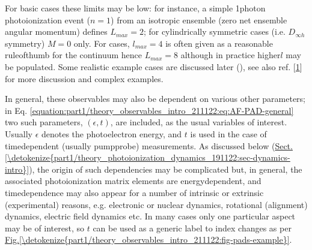 \documentclass[letterpaper,table,10pt,english]{jupyterBook}
\begin{document}
\sphinxAtStartPar
For basic cases these limits may be low: for instance, a simple 1\sphinxhyphen{}photon photoionization event (\(n=1\)) from an isotropic ensemble (zero net ensemble angular momentum) defines \(L_{max}=2\); for cylindrically symmetric cases (i.e. \(D_{\infty h}\) symmetry) \(M=0\) only. For {\hyperref[\detokenize{backmatter/glossary:term-MF}]{}} cases, \(l_{max}=4\) is often given as a reasonable rule\sphinxhyphen{}of\sphinxhyphen{}thumb for the continuum \sphinxhyphen{} hence \(L_{max}=8\) \sphinxhyphen{} although in practice higher\sphinxhyphen{}\(l\) may be populated. Some realistic example cases are discussed later (), see also ref. {[}\hyperlink{cite.backmatter/bibliography:id569}{1}{]} for more discussion and complex examples.

\sphinxAtStartPar
In general, these observables may also be dependent on various other parameters; in Eq. \eqref{equation:part1/theory_observables_intro_211122:eq:AF-PAD-general} two such parameters, \((\epsilon,t)\), are included, as the usual variables of interest. Usually \(\epsilon\) denotes the photoelectron energy, and \(t\) is used in the case of time\sphinxhyphen{}dependent (usually pump\sphinxhyphen{}probe) measurements. As discussed below (\hyperref[\detokenize{part1/theory_photoionization_dynamics_191122:sec-dynamics-intro}]{Sect.\@ \ref{\detokenize{part1/theory_photoionization_dynamics_191122:sec-dynamics-intro}}}), the origin of such dependencies may be complicated but, in general, the associated photoionization matrix elements are energy\sphinxhyphen{}dependent, and time\sphinxhyphen{}dependence may also appear for a number of intrinsic or extrinsic (experimental) reasons, e.g. electronic or nuclear dynamics, rotational (alignment) dynamics, electric field dynamics etc. In many cases only one particular aspect may be of interest, so \(t\) can be used as a generic label to index changes as per \hyperref[\detokenize{part1/theory_observables_intro_211122:fig-pads-example}]{Fig.\@ \ref{\detokenize{part1/theory_observables_intro_211122:fig-pads-example}}}.
\end{document}
